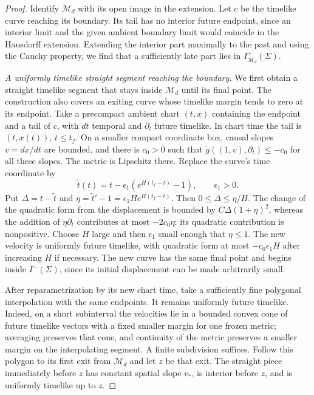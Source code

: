 \begin{proof}
Identify $\mathcal M_d$ with its open image in the extension.
Let $c$ be the timelike curve reaching its boundary. Its tail has no
interior future endpoint, since an interior limit and the given
ambient boundary limit would coincide in the Hausdorff extension.
Extending the interior part maximally to the past and using the
Cauchy property, we find that a sufficiently late part lies in
$I^+_{\mathcal M_d}(\Sigma)$.

\emph{A uniformly timelike straight segment reaching the boundary.}
We first obtain a straight timelike segment that stays inside
$\mathcal M_d$ until its final point. The construction also covers
an exiting curve whose timelike margin tends to zero at its endpoint.
Take a precompact ambient chart $(t,x)$ containing the endpoint and
a tail of $c$, with $dt$ temporal and $\partial_t$ future timelike.
In chart time the tail is $(t,x(t))$, $t\le t_f$. On a smaller
compact coordinate box, causal slopes $v=dx/dt$ are bounded, and
there is $c_0>0$ such that
$\widetilde g((1,v),\partial_t)\le-c_0$ for all these slopes.
The metric is Lipschitz there. Replace the curve's time coordinate by
\[
 \widetilde t(t)=t-\epsilon_1(e^{H(t_f-t)}-1),
 \qquad \epsilon_1>0.
\]
Put $\Delta=t-\widetilde t$ and
$\eta=\widetilde t'-1=\epsilon_1H e^{H(t_f-t)}$.
Then $0\le\Delta\le\eta/H$. The change of the quadratic form
from the displacement is bounded by $C\Delta(1+\eta)^2$, whereas
the addition of $\eta\partial_t$ contributes at most
$-2c_0\eta$; its quadratic contribution is nonpositive.
Choose $H$ large and then $\epsilon_1$ small enough that
$\eta\le1$. The new velocity is uniformly future timelike, with
quadratic form at most $-c_0\epsilon_1H$ after increasing $H$ if
necessary. The new curve has the same final point and begins inside
$I^+(\Sigma)$, since its initial displacement can be made
arbitrarily small.

After reparametrization by its new chart time, take a sufficiently
fine polygonal interpolation with the same endpoints. It remains
uniformly future timelike. Indeed, on a short subinterval the
velocities lie in a bounded convex cone of future timelike vectors
with a fixed smaller margin for one frozen metric; averaging preserves
that cone, and continuity of the metric preserves a smaller margin
on the interpolating segment. A finite subdivision suffices.
Follow this polygon to its first exit from $\mathcal M_d$ and let
$z$ be that exit. The straight piece immediately before $z$ has
constant spatial slope $v_*$, is interior before $z$, and is uniformly
timelike up to $z$.


\end{proof}
